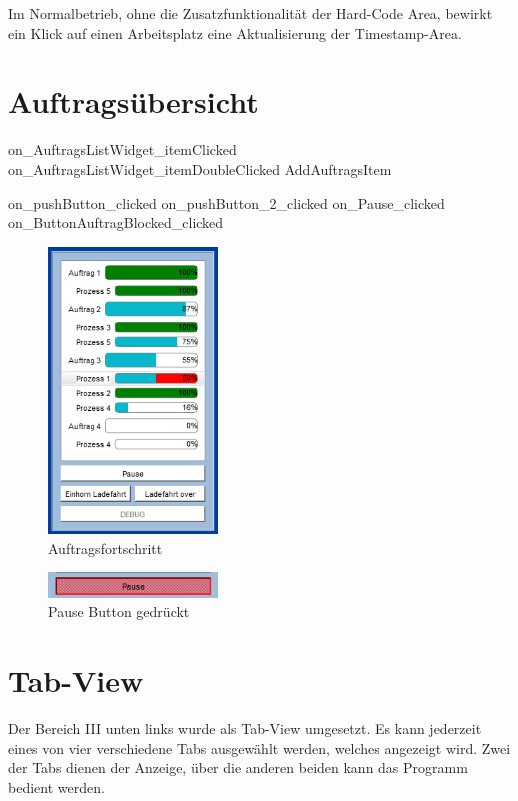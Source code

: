 Im Normalbetrieb, ohne die Zusatzfunktionalität der Hard-Code Area, bewirkt ein Klick auf einen Arbeitsplatz eine Aktualisierung der Timestamp-Area. 

\section{Auftragsübersicht}
\label{sec:Auftragsuebersicht}
on_AuftragsListWidget_itemClicked
on_AuftragsListWidget_itemDoubleClicked
AddAuftragsItem

on_pushButton_clicked
on_pushButton_2_clicked
on_Pause_clicked
on_ButtonAuftragBlocked_clicked

\begin{figure}[htb]
    \centering
    \includegraphics[width=0.4\textwidth]{Abbildungen/Auftragsfortschritt.png}
    \caption{Auftragsfortschritt}		
    \label{fig:Auftragsfortschritt}
\end{figure}

\begin{figure}[htb]
    \centering
    \includegraphics[width=0.4\textwidth]{Abbildungen/Pause.png}
    \caption{Pause Button gedrückt}		
    \label{fig:Pause}
\end{figure}

\section{Tab-View}

Der Bereich III unten links wurde als Tab-View umgesetzt. Es kann jederzeit eines von vier verschiedene Tabs ausgewählt werden, welches angezeigt wird. Zwei der Tabs dienen der Anzeige, über die anderen beiden kann das Programm bedient werden. 

